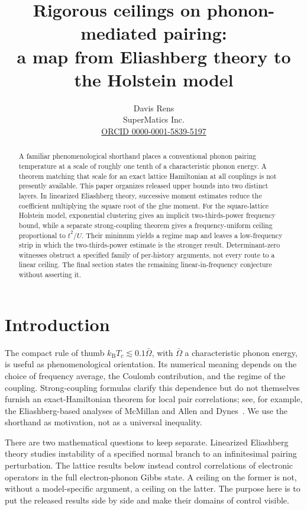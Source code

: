 \documentclass[11pt]{article}
\title{Rigorous ceilings on phonon-mediated pairing:\\ a map from Eliashberg theory to the Holstein model}
\author{Davis Rens\\SuperMatics Inc.\\\href{https://orcid.org/0000-0001-5839-5197}{ORCID 0000-0001-5839-5197}}
\date{\parbox{.98\linewidth}{\centering\scriptsize
20 November 2026\qquad Article DOI: \href{https://doi.org/10.5281/zenodo.24406996}{\CAPSTONEDOI}\\
Source repository: \expandafter\url\expandafter{\CAPSTONEREPO}
}}
\newcommand{\kb}{k_{\mathrm B}}
\begin{document}
\maketitle

\begin{abstract}
A familiar phenomenological shorthand places a conventional phonon pairing temperature at a scale of roughly one tenth of a characteristic phonon energy. A theorem matching that scale for an exact lattice Hamiltonian at all couplings is not presently available. This paper organizes released upper bounds into two distinct layers. In linearized Eliashberg theory, successive moment estimates reduce the coefficient multiplying the square root of the glue moment. For the square-lattice Holstein model, exponential clustering gives an implicit two-thirds-power frequency bound, while a separate strong-coupling theorem gives a frequency-uniform ceiling proportional to $t^2/U$. Their minimum yields a regime map and leaves a low-frequency strip in which the two-thirds-power estimate is the stronger result. Determinant-zero witnesses obstruct a specified family of per-history arguments, not every route to a linear ceiling. The final section states the remaining linear-in-frequency conjecture without asserting it.
\end{abstract}

\section{Introduction}

The compact rule of thumb $\kb T_c\lesssim0.1\bar\Omega$, with $\bar\Omega$ a characteristic phonon energy, is useful as phenomenological orientation. Its numerical meaning depends on the choice of frequency average, the Coulomb contribution, and the regime of the coupling. Strong-coupling formulas clarify this dependence but do not themselves furnish an exact-Hamiltonian theorem for local pair correlations; see, for example, the Eliashberg-based analyses of McMillan and Allen and Dynes~\cite{mcmillan,allendynes}. We use the shorthand as motivation, not as a universal inequality.

There are two mathematical questions to keep separate. Linearized Eliashberg theory studies instability of a specified normal branch to an infinitesimal pairing perturbation. The lattice results below instead control correlations of electronic operators in the full electron-phonon Gibbs state. A ceiling on the former is not, without a model-specific argument, a ceiling on the latter. The purpose here is to put the released results side by side and make their domains of control visible.
\end{document}
